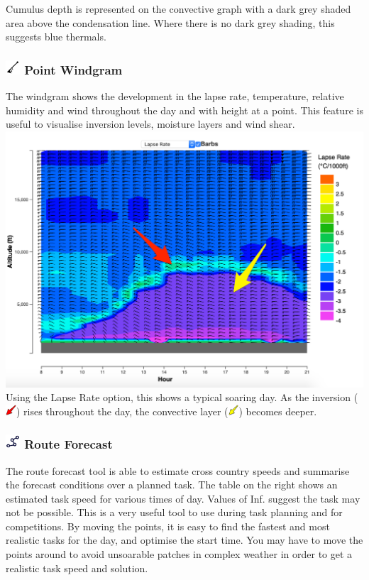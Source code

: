 \documentclass[9pt,a4paper,twocolumn]{article}
\begin{document}
Cumulus depth is represented on the convective graph with a dark grey shaded area above the condensation line. Where there is no dark grey shading, this suggests blue thermals.
\subsubsection*{\includegraphics[height=15pt]{images/icons/windgram.png} Point Windgram}
The windgram shows the development in the lapse rate, temperature, relative humidity and wind throughout the day and with height at a point. This feature is useful to visualise inversion levels, moisture layers and wind shear.
\includegraphics[width=\linewidth]{images/windgram_lapse_annot.png}
Using the Lapse Rate option, this shows a typical soaring day. As the inversion (\includegraphics[height=11pt]{images/icons/arrow_red.png}) rises throughout the day, the convective layer (\includegraphics[height=11pt]{images/icons/arrow_yellow.png}) becomes deeper.
\subsubsection*{\includegraphics[height=15pt]{images/icons/route.png} Route Forecast}
The route forecast tool is able to estimate cross country speeds and summarise the forecast conditions over a planned task. The table on the right shows an estimated task speed for various times of day. Values of Inf. suggest the task may not be possible. This is a very useful tool to use during task planning and for competitions. By moving the points, it is easy to find the fastest and most realistic tasks for the day, and optimise the start time. You may have to move the points around to avoid unsoarable patches in complex weather in order to get a realistic task speed and solution.
\end{document}
